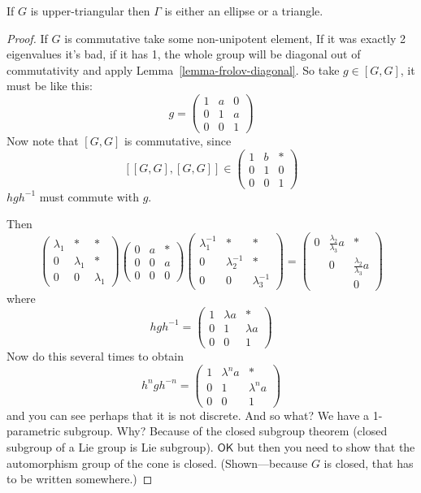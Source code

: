 \begin{lemma}
\label{lemma-frolov-upper-triangular}
If $G$ is upper-triangular then $\Gamma$ is
either an ellipse or a triangle.
\end{lemma}

\begin{proof}
If $G$ is commutative take some non-unipotent
element, If it was exactly 2 eigenvalues it's
bad, if it has 1, the whole group will be
diagonal out of commutativity and apply
Lemma~\ref{lemma-frolov-diagonal}. So take
$g\in [G,G]$, it must be like this:
$$g=\begin{pmatrix} 1 & a & 0 \\ 0 & 1 & a \\
0 & 0 & 1 \end{pmatrix}$$
Now note that $[G,G]$ is commutative, since
$$[ [G,G],[G,G]]\in\begin{pmatrix} 1 & b &
*\\ 0 & 1 & 0\\ 0 & 0 & 1 \end{pmatrix}$$
$hgh^{-1}$ must commute with $g$.

Then
$$\begin{pmatrix} \lambda_1 & * & *\\ 0 &
\lambda_1 & *\\ 0 & 0 & \lambda_1
\end{pmatrix} \begin{pmatrix} 0 & a & * \\ 0
& 0 & a\\ 0 & 0 & 0 \end{pmatrix}
\begin{pmatrix} \lambda_1^{-1} & * & *\\ 0 &
\lambda_2^{-1} & *\\ 0 & 0 & \lambda_3^{-1}
\end{pmatrix}=\begin{pmatrix} 0 &
\frac{\lambda_2}{\lambda_3}a & *\\ & 0 &
\frac{\lambda_2}{\lambda_3}a\\ & & 0
\end{pmatrix}$$
where
$$hgh^{-1}=\begin{pmatrix} 1 & \lambda a &
*\\ 0 & 1 & \lambda a\\ 0 & 0 & 1
\end{pmatrix}$$
Now do this several times to obtain
$$h^ngh^{-n}=\begin{pmatrix} 1 & \lambda^na &
*\\ 0 & 1 & \lambda^n a\\0 & 0 & 1
\end{pmatrix}$$
and you can see perhaps that it is not
discrete. And so what? We have a 1-parametric
subgroup. Why? Because of the closed subgroup
theorem (closed subgroup of a Lie group is
Lie subgroup). $\mathsf{OK}$ but then you
need to show that the automorphism group of
the cone is closed. (Shown---because $G$ is
closed, that has to be written somewhere.)


\end{proof}
